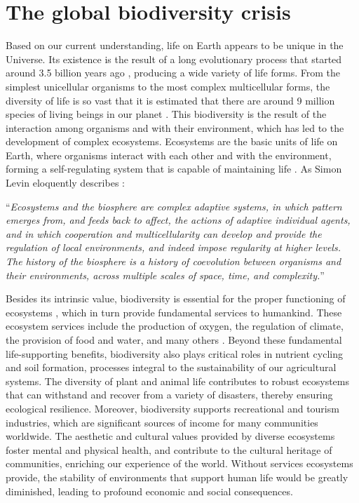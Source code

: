 \setcounter{page}{1}

\section{\label{sec:The global biodiversity crisis} The global biodiversity
  crisis}

Based on our current understanding, life on Earth appears to be unique in the
Universe. Its existence is the result of a long evolutionary process that
started around 3.5 billion years ago \cite{Taylor_1993,Schopf2006},
producing a wide variety of life forms. From the simplest unicellular organisms
to the most complex multicellular forms, the diversity of life is so vast that
it is estimated that there are around 9 million species of living beings in our
planet \cite{Cardinale2012}. This biodiversity is the result of the interaction
among organisms and with their environment, which has led to the development of
complex ecosystems. Ecosystems are the basic units of life on Earth, where
organisms interact with each other and with the environment, forming a
self-regulating system that is capable of maintaining life \cite{Levin2005}.
As Simon Levin eloquently describes \cite{Levin2005}:

\begin{displayquote}
  ``\textit{Ecosystems and the biosphere are complex adaptive systems, in which
    pattern
    emerges from, and feeds back to affect, the actions of adaptive individual
    agents, and in which cooperation and multicellularity can develop and
    provide
    the regulation of local environments, and indeed impose regularity at
    higher
    levels. The history of the biosphere is a history of coevolution between
    organisms and their environments, across multiple scales of space, time,
    and
    complexity.}''
\end{displayquote}

Besides its intrinsic value, biodiversity is essential for the proper
functioning of ecosystems \cite{Gamfeldt2008}, which in turn provide
fundamental services to humankind. These ecosystem services include the
production of oxygen, the regulation of climate, the provision of food and
water, and many others \cite{Daily1997}. Beyond these fundamental
life-supporting benefits, biodiversity also plays critical roles in nutrient
cycling and soil formation, processes integral to the sustainability of our
agricultural systems. The diversity of plant and animal life contributes to
robust ecosystems that can withstand and recover from a variety of disasters,
thereby ensuring ecological resilience. Moreover, biodiversity supports
recreational and tourism industries, which are significant sources of income
for many communities worldwide. The aesthetic and cultural values provided by
diverse ecosystems foster mental and physical health, and contribute to the
cultural heritage of communities, enriching our experience of the world.
Without services ecosystems provide, the stability of environments that support
human life would be greatly diminished, leading to profound economic and social
consequences.

